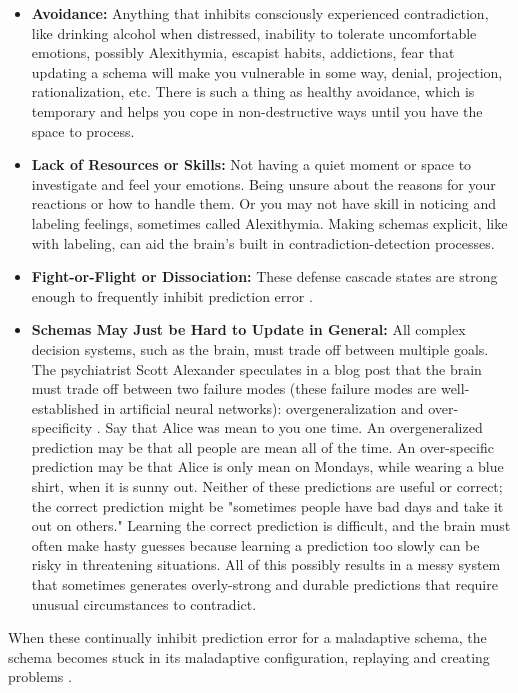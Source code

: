 \documentclass[12pt,letterpaper]{book}
\begin{document}
\begin{itemize}
    \item \textbf{Avoidance:} Anything that inhibits consciously experienced contradiction, like drinking alcohol when distressed, inability to tolerate uncomfortable emotions, possibly Alexithymia, escapist habits, addictions, fear that updating a schema will make you vulnerable in some way, denial, projection, rationalization, etc. There is such a thing as healthy avoidance, which is temporary and helps you cope in non-destructive ways until you have the space to process.
    \item \textbf{Lack of Resources or Skills:} Not having a quiet moment or space to investigate and feel your emotions. Being unsure about the reasons for your reactions or how to handle them. Or you may not have skill in noticing and labeling feelings, sometimes called Alexithymia. Making schemas explicit, like with labeling, can aid the brain's built in contradiction-detection processes.
    \item \textbf{Fight-or-Flight or Dissociation:} These defense cascade states are strong enough to frequently inhibit prediction error \cite{razviPSIP}.
    \item \textbf{Schemas May Just be Hard to Update in General:} All complex decision systems, such as the brain, must trade off between multiple goals. The psychiatrist Scott Alexander speculates in a blog post that the brain must trade off between two failure modes (these failure modes are well-established in artificial neural networks): overgeneralization and over-specificity \cite{alexanderMountains}. Say that Alice was mean to you one time. An overgeneralized prediction may be that all people are mean all of the time. An over-specific prediction may be that Alice is only mean on Mondays, while wearing a blue shirt, when it is sunny out. Neither of these predictions are useful or correct; the correct prediction might be "sometimes people have bad days and take it out on others." Learning the correct prediction is difficult, and the brain must often make hasty guesses because learning a prediction too slowly can be risky in threatening situations. All of this possibly results in a messy system that sometimes generates overly-strong and durable predictions that require unusual circumstances to contradict.
\end{itemize}
\label{def:schemas} When these continually inhibit prediction error for a maladaptive schema, the schema becomes stuck in its maladaptive configuration, replaying and creating problems \cite{rachmanProcessing,eckerUnlocking}.
\end{document}
